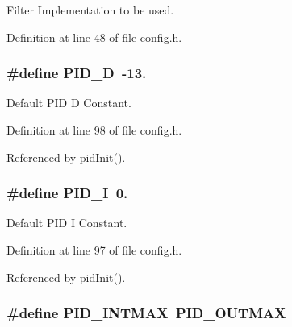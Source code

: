 Filter Implementation to be used. 



Definition at line 48 of file config.\-h.

\hypertarget{group__config_ga2a442b8579a5c5f9526e824165125497}{
\subsubsection[{P\-I\-D\-\_\-\-D}]{\setlength{\rightskip}{0pt plus 5cm}\#define P\-I\-D\-\_\-\-D~-\/13.}}\label{group__config_ga2a442b8579a5c5f9526e824165125497}


Default P\-I\-D D Constant. 



Definition at line 98 of file config.\-h.



Referenced by pid\-Init().

\hypertarget{group__config_ga2dfd5fcf8dd0bee1de9007fe8e161886}{
\subsubsection[{P\-I\-D\-\_\-\-I}]{\setlength{\rightskip}{0pt plus 5cm}\#define P\-I\-D\-\_\-\-I~0.}}\label{group__config_ga2dfd5fcf8dd0bee1de9007fe8e161886}


Default P\-I\-D I Constant. 



Definition at line 97 of file config.\-h.



Referenced by pid\-Init().

\hypertarget{group__config_ga50582411cbb3f8a20ffd3aa2254ddf71}{
\subsubsection[{P\-I\-D\-\_\-\-I\-N\-T\-M\-A\-X}]{\setlength{\rightskip}{0pt plus 5cm}\#define P\-I\-D\-\_\-\-I\-N\-T\-M\-A\-X~{\bf P\-I\-D\-\_\-\-O\-U\-T\-M\-A\-X}}}\label{group__config_ga50582411cbb3f8a20ffd3aa2254ddf71}


